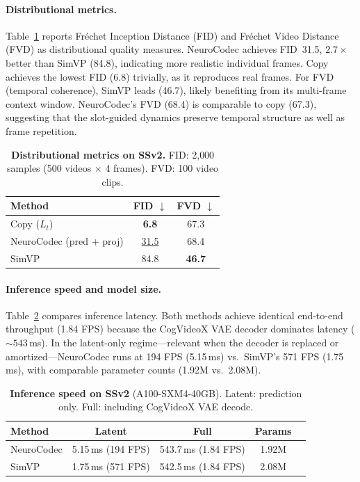 \documentclass{article}
\newcommand{\method}{NeuroCodec}
\begin{document}
\paragraph{Distributional metrics.}
Table~\ref{tab:ssv2_fid_fvd} reports Fr\'echet Inception Distance (FID)
and Fr\'echet Video Distance (FVD) as distributional quality measures.
\method{} achieves FID~31.5, $2.7\times$ better than SimVP (84.8),
indicating more realistic individual frames.
Copy achieves the lowest FID (6.8) trivially, as it reproduces real
frames.
For FVD (temporal coherence), SimVP leads (46.7), likely benefiting from
its multi-frame context window.
\method{}'s FVD (68.4) is comparable to copy (67.3), suggesting that the
slot-guided dynamics preserve temporal structure as well as frame
repetition.

\begin{table}[t]
\centering
\caption{%
  \textbf{Distributional metrics on SSv2.}
  FID: 2{,}000 samples (500 videos $\times$ 4 frames).
  FVD: 100 video clips.
}
\label{tab:ssv2_fid_fvd}
\begin{tabular}{@{}lcc@{}}
\toprule
Method & FID $\downarrow$ & FVD $\downarrow$ \\
\midrule
Copy ($L_t$)
  & \textbf{6.8}
  & 67.3 \\
\method{} (pred + proj)
  & \underline{31.5}
  & 68.4 \\
SimVP~\cite{gao2022simvp}
  & 84.8
  & \textbf{46.7} \\
\bottomrule
\end{tabular}
\end{table}

\paragraph{Inference speed and model size.}
Table~\ref{tab:ssv2_speed} compares inference latency.
Both methods achieve identical end-to-end throughput (1.84 FPS) because
the CogVideoX VAE decoder dominates latency (${\sim}543$\,ms).
In the latent-only regime---relevant when the decoder is replaced or
amortized---\method{} runs at 194 FPS (5.15\,ms) vs.\ SimVP's 571 FPS
(1.75\,ms), with comparable parameter counts (1.92M vs.\ 2.08M).

\begin{table}[t]
\centering
\caption{%
  \textbf{Inference speed on SSv2} (A100-SXM4-40GB).
  Latent: prediction only.
  Full: including CogVideoX VAE decode.
}
\label{tab:ssv2_speed}
\begin{tabular}{@{}lcccc@{}}
\toprule
Method & Latent & Full & Params \\
\midrule
\method{}
  & 5.15\,ms (194 FPS)
  & 543.7\,ms (1.84 FPS)
  & 1.92M \\
SimVP~\cite{gao2022simvp}
  & 1.75\,ms (571 FPS)
  & 542.5\,ms (1.84 FPS)
  & 2.08M \\
\bottomrule
\end{tabular}
\end{table}
\end{document}
